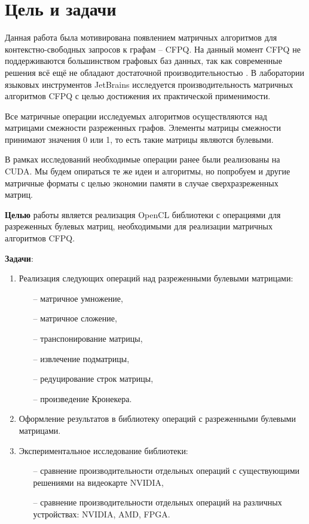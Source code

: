 \documentclass[14pt]{extarticle}
\newcommand{\sectionbreak}{\clearpage}
\begin{document}
	 \sectionbreak
	 
\section*{Цель и задачи}
\label{sec:goals}

	 Данная работа была мотивирована появлением матричных алгоритмов для контекстно-свободных запросов к графам -- CFPQ. На данный момент CFPQ не поддерживаются большинством графовых баз данных, так как современные решения всё ещё не обладают достаточной производительностью \cite{kup}. В лаборатории языковых инструментов JetBrains исследуется производительность матричных алгоритмов CFPQ \cite{cfpq_all} с целью достижения их практической применимости.
	 
	 Все матричные операции исследуемых алгоритмов осуществляются над матрицами смежности разреженных графов. Элементы матрицы смежности принимают значения 0 или 1, то есть такие матрицы являются булевыми.
	 
	 В рамках исследований необходимые операции ранее были реализованы на CUDA. Мы будем опираться те же идеи и алгоритмы, но попробуем и другие матричные форматы с целью экономии памяти в случае сверхразреженных матриц.
	 
	 \textbf{Целью} работы является реализация OpenCL библиотеки с операциями для разреженных булевых матриц, необходимыми для реализации матричных алгоритмов CFPQ.
	 
	 \textbf{Задачи}:
	 \begin{enumerate}[itemsep=0mm, topsep=0pt]
	 	\item Реализация следующих операций над разреженными булевыми матрицами:
	 	\begin{enumerate}[itemsep=0mm, topsep=0pt]
	 		\item[--] матричное умножение,
	 		\item[--] матричное сложение,
	 		\item[--] транспонирование матрицы,
	 		\item[--] извлечение подматрицы,
	 		\item[--] редуцирование строк матрицы,
	 		\item[--] произведение Кронекера.
	 	\end{enumerate}
	 	\item Оформление результатов в библиотеку операций с разреженными булевыми матрицами.
	 	\item Экспериментальное исследование библиотеки: 
	 	\begin{enumerate}[itemsep=0mm, topsep=0pt]
	 		\item[--] сравнение производительности отдельных операций с существующими решениями на видеокарте NVIDIA,
	 		\item[--] сравнение производительности отдельных операций на различных устройствах: NVIDIA, AMD, FPGA.
	 	\end{enumerate}
	 	
	\end{enumerate}
	 
\end{document}
